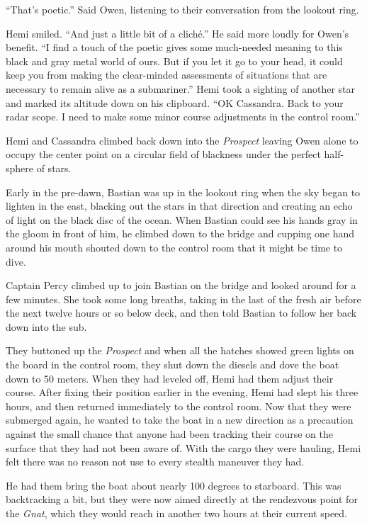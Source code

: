\documentclass[
]{scrbook}
\begin{document}
``That's poetic.'' Said Owen, listening to their conversation from the
lookout ring.

Hemi smiled. ``And just a little bit of a cliché.'' He said more loudly
for Owen's benefit. ``I find a touch of the poetic gives some
much-needed meaning to this black and gray metal world of ours. But if
you let it go to your head, it could keep you from making the
clear-minded assessments of situations that are necessary to remain
alive as a submariner.'' Hemi took a sighting of another star and marked
its altitude down on his clipboard. ``OK Cassandra. Back to your radar
scope. I need to make some minor course adjustments in the control
room.''

Hemi and Cassandra climbed back down into the \emph{Prospect} leaving
Owen alone to occupy the center point on a circular field of blackness
under the perfect half-sphere of stars.

Early in the pre-dawn, Bastian was up in the lookout ring when the sky
began to lighten in the east, blacking out the stars in that direction
and creating an echo of light on the black disc of the ocean. When
Bastian could see his hands gray in the gloom in front of him, he
climbed down to the bridge and cupping one hand around his mouth shouted
down to the control room that it might be time to dive.

Captain Percy climbed up to join Bastian on the bridge and looked around
for a few minutes. She took some long breaths, taking in the last of the
fresh air before the next twelve hours or so below deck, and then told
Bastian to follow her back down into the sub.

They buttoned up the \emph{Prospect} and when all the hatches showed
green lights on the board in the control room, they shut down the
diesels and dove the boat down to 50 meters. When they had leveled off,
Hemi had them adjust their course. After fixing their position earlier
in the evening, Hemi had slept his three hours, and then returned
immediately to the control room. Now that they were submerged again, he
wanted to take the boat in a new direction as a precaution against the
small chance that anyone had been tracking their course on the surface
that they had not been aware of. With the cargo they were hauling, Hemi
felt there was no reason not use to every stealth maneuver they had.

He had them bring the boat about nearly 100 degrees to starboard. This
was backtracking a bit, but they were now aimed directly at the
rendezvous point for the \emph{Gnat}, which they would reach in another
two hours at their current speed.
\end{document}
